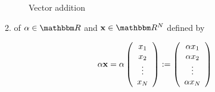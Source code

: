 \begin{frame}
    

\begin{figure}

  \begin{center}
   \caption{\label{f:vec_add} Vector addition}
  \end{center}
  
\end{figure}



\end{frame}


\begin{frame}
    
    2.  of $\alpha \in \RR$ and $\boldx \in \RR^N$ defined by
    
    \begin{equation*}
        \alpha {\mathbf x} 
        =
        \alpha \left(
        \begin{array}{c}
            x_1 \\
            x_2 \\
            \vdots \\
            x_N
        \end{array}
        \right)
        :=
        \left(
        \begin{array}{c}
            \alpha x_1 \\
            \alpha x_2 \\
            \vdots \\
            \alpha x_N
        \end{array}
        \right)
    \end{equation*}

\end{frame}



